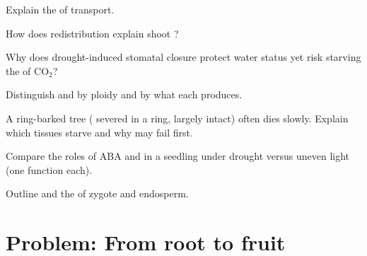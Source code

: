 \begin{exercise}[$\star\star$]\label{exo:g12:plant-biology:6}
Explain the  of  transport.
\end{exercise}

\begin{exercise}[$\star\star$]\label{exo:g12:plant-biology:7}
How does  redistribution explain shoot ?
\end{exercise}

\begin{exercise}[$\star\star$]\label{exo:g12:plant-biology:8}
Why does drought-induced stomatal closure protect water status yet risk
starving the  of CO$_2$?
\end{exercise}

\begin{exercise}[$\star\star$]\label{exo:g12:plant-biology:9}
Distinguish  and  by ploidy and by what each
produces.
\end{exercise}

\begin{exercise}[$\star\star\star$]\label{exo:g12:plant-biology:10}
A ring-barked tree ( severed in a ring,  largely intact) often
dies slowly. Explain which tissues starve and why  may fail first.
\end{exercise}

\begin{exercise}[$\star\star\star$]\label{exo:g12:plant-biology:11}
Compare the roles of ABA and  in a seedling under drought versus
uneven light (one function each).
\end{exercise}

\begin{exercise}[$\star\star\star$]\label{exo:g12:plant-biology:12}
Outline  and the  of zygote and endosperm.
\end{exercise}

\section{Problem: From root to fruit}

